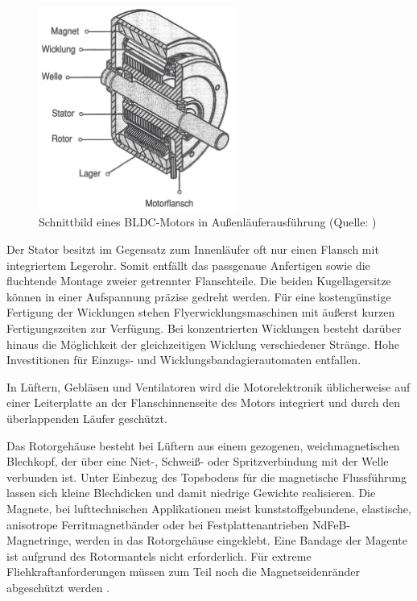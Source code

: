 \begin{figure}[h]
  \centering
  \includegraphics[width=6.5cm]{./Grafiken/3_2}
  \caption[Schnittbild eines BLDC-Motors in Außenläuferausführung]{Schnittbild eines BLDC-Motors in Außenläuferausführung (Quelle: \parencite[S.  76]{Stölting2011})}
  \label{fig:3_2}
\end{figure}

Der Stator besitzt im Gegensatz zum Innenläufer oft nur einen Flansch mit integriertem Legerohr. Somit entfällt das passgenaue Anfertigen sowie die fluchtende Montage zweier getrennter Flanschteile. Die beiden Kugellagersitze können in einer Aufspannung präzise gedreht werden. Für eine kostengünstige Fertigung der Wicklungen stehen Flyerwicklungsmaschinen mit äußerst kurzen Fertigungszeiten zur Verfügung. Bei konzentrierten Wicklungen besteht darüber hinaus die Möglichkeit der gleichzeitigen Wicklung verschiedener Stränge. Hohe Investitionen für Einzugs- und Wicklungsbandagierautomaten entfallen.

In Lüftern, Gebläsen und Ventilatoren wird die Motorelektronik üblicherweise auf einer Leiterplatte an der Flanschinnenseite des Motors integriert und durch den überlappenden Läufer geschützt.

Das Rotorgehäuse besteht bei Lüftern aus einem gezogenen, weichmagnetischen Blechkopf, der über eine Niet-, Schweiß- oder Spritzverbindung mit der Welle verbunden ist. Unter Einbezug des Topsbodens für die magnetische Flussführung lassen sich kleine Blechdicken und damit niedrige Gewichte realisieren. Die Magnete, bei lufttechnischen Applikationen meist kunststoffgebundene, elastische, anisotrope Ferritmagnetbänder oder bei Festplattenantrieben NdFeB-Magnetringe, werden in das Rotorgehäuse eingeklebt. Eine Bandage der Magente ist aufgrund des Rotormantels nicht erforderlich. Für extreme Fliehkraftanforderungen müssen zum Teil noch die Magnetseidenränder abgeschützt werden \parencite[S.  76--77]{Stölting2011}.

